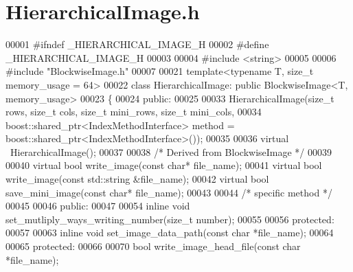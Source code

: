 \section{Hierarchical\-Image.\-h}
\label{_hierarchical_image_8h}

\begin{DoxyCode}
00001 \textcolor{preprocessor}{#ifndef \_HIERARCHICAL\_IMAGE\_H}
00002 \textcolor{preprocessor}{}\textcolor{preprocessor}{#define \_HIERARCHICAL\_IMAGE\_H}
00003 \textcolor{preprocessor}{}
00004 \textcolor{preprocessor}{#include <string>}
00005 
00006 \textcolor{preprocessor}{#include "BlockwiseImage.h"}
00007 
00021 \textcolor{keyword}{template}<\textcolor{keyword}{typename} T, \textcolor{keywordtype}{size\_t} memory\_usage = 64>
00022 \textcolor{keyword}{class }HierarchicalImage: \textcolor{keyword}{public} BlockwiseImage<T, memory\_usage>
00023 \{
00024 \textcolor{keyword}{public}:
00025 
00033         HierarchicalImage(\textcolor{keywordtype}{size\_t} rows, \textcolor{keywordtype}{size\_t} cols, \textcolor{keywordtype}{size\_t} mini\_rows, \textcolor{keywordtype}{size\_t} 
      mini\_cols,
00034                 boost::shared\_ptr<IndexMethodInterface> method = 
      boost::shared\_ptr<IndexMethodInterface>());
00035 
00036         \textcolor{keyword}{virtual} ~HierarchicalImage();
00037 
00038 \textcolor{comment}{/* Derived from BlockwiseImage */}
00039 
00040         \textcolor{keyword}{virtual} \textcolor{keywordtype}{bool} write_image(\textcolor{keyword}{const} \textcolor{keywordtype}{char}* file\_name);
00041         \textcolor{keyword}{virtual} \textcolor{keywordtype}{bool} write_image(\textcolor{keyword}{const} std::string &file\_name);
00042         \textcolor{keyword}{virtual} \textcolor{keywordtype}{bool} save_mini_image(\textcolor{keyword}{const} \textcolor{keywordtype}{char}* file\_name);
00043 
00044 \textcolor{comment}{/* specific method */}
00045 
00046 \textcolor{keyword}{public}:
00047 
00054         \textcolor{keyword}{inline} \textcolor{keywordtype}{void} set_mutliply_ways_writing_number(\textcolor{keywordtype}{size\_t} number);
00055 
00056 \textcolor{keyword}{protected}:
00057 
00063         \textcolor{keyword}{inline} \textcolor{keywordtype}{void} set_image_data_path(\textcolor{keyword}{const} \textcolor{keywordtype}{char} *file\_name); 
00064 
00065 \textcolor{keyword}{protected}:
00066 
00070         \textcolor{keywordtype}{bool} write_image_head_file(\textcolor{keyword}{const} \textcolor{keywordtype}{char} *file\_name);

\end{DoxyCode}
